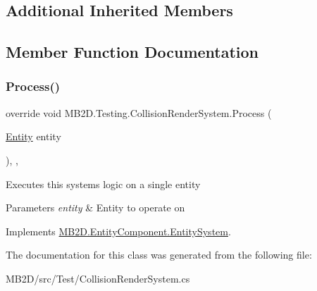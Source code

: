 \subsection*{Additional Inherited Members}


\subsection{Member Function Documentation}
\hypertarget{class_m_b2_d_1_1_testing_1_1_collision_render_system_af7b7ffdb316533a084e98cbea97a096f}{}\label{class_m_b2_d_1_1_testing_1_1_collision_render_system_af7b7ffdb316533a084e98cbea97a096f} 
\subsubsection{\texorpdfstring{Process()}{Process()}}
{\footnotesize\ttfamily override void M\+B2\+D.\+Testing.\+Collision\+Render\+System.\+Process (\begin{DoxyParamCaption}\item[{\hyperlink{class_m_b2_d_1_1_entity_component_1_1_entity}{Entity}}]{entity }\end{DoxyParamCaption})\hspace{0.3cm}{\ttfamily [inline]}, {\ttfamily [protected]}, {\ttfamily [virtual]}}



Executes this systems logic on a single entity 


\begin{DoxyParams}{Parameters}
{\em entity} & Entity to operate on\\
\hline
\end{DoxyParams}


Implements \hyperlink{class_m_b2_d_1_1_entity_component_1_1_entity_system_abbf83b87cb5d12754fb058cef50451fa}{M\+B2\+D.\+Entity\+Component.\+Entity\+System}.



The documentation for this class was generated from the following file\+:\begin{DoxyCompactItemize}
\item 
M\+B2\+D/src/\+Test/Collision\+Render\+System.\+cs\end{DoxyCompactItemize}
